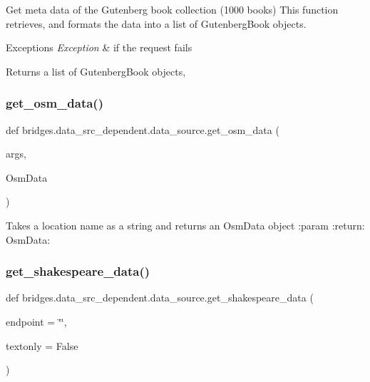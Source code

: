 Get meta data of the Gutenberg book collection (1000 books) This function retrieves, and formats the data into a list of Gutenberg\+Book objects. 


\begin{DoxyExceptions}{Exceptions}
{\em Exception} & if the request fails\\
\hline
\end{DoxyExceptions}
\begin{DoxyReturn}{Returns}
a list of Gutenberg\+Book objects, 
\end{DoxyReturn}
\mbox{\label{namespacebridges_1_1data__src__dependent_1_1data__source_acbb9052453e120b99ac32b27fd99bb07}} 
\subsubsection{\texorpdfstring{get\+\_\+osm\+\_\+data()}{get\_osm\_data()}}
{\footnotesize\ttfamily def bridges.\+data\+\_\+src\+\_\+dependent.\+data\+\_\+source.\+get\+\_\+osm\+\_\+data (\begin{DoxyParamCaption}\item[{}]{args,  }\item[{}]{Osm\+Data }\end{DoxyParamCaption})}



Takes a location name as a string and returns an Osm\+Data object \+:param \+:return\+: Osm\+Data\+: 

\mbox{\label{namespacebridges_1_1data__src__dependent_1_1data__source_a141593343ceef42e35072b3151a8b2db}} 
\subsubsection{\texorpdfstring{get\+\_\+shakespeare\+\_\+data()}{get\_shakespeare\_data()}}
{\footnotesize\ttfamily def bridges.\+data\+\_\+src\+\_\+dependent.\+data\+\_\+source.\+get\+\_\+shakespeare\+\_\+data (\begin{DoxyParamCaption}\item[{}]{endpoint = {\ttfamily \char`\"{}\char`\"{}},  }\item[{}]{textonly = {\ttfamily False} }\end{DoxyParamCaption})}



